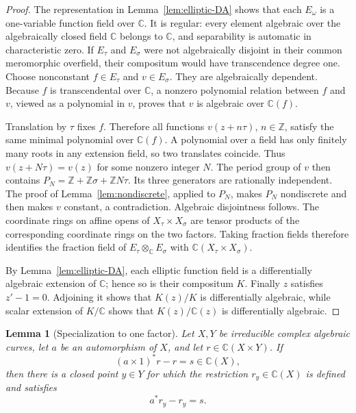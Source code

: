 \documentclass[11pt]{article}
\numberwithin{equation}{section}
\newtheorem{lemma}[theorem]{Lemma}
\theoremstyle{definition}
\theoremstyle{remark}
\newcommand{\C}{\mathbb C}
\newcommand{\Z}{\mathbb Z}
\begin{document}
\begin{proof}
The representation in Lemma~\ref{lem:elliptic-DA} shows that each
$E_\omega$ is a one-variable function field over $\C$.  It is regular:
every element algebraic over the algebraically closed field $\C$ belongs to
$\C$, and separability is automatic in characteristic zero.  If
$E_\tau$ and $E_\sigma$ were not
algebraically disjoint in their common meromorphic overfield, their
compositum would have transcendence degree one.  Choose nonconstant
$f\in E_\tau$ and $v\in E_\sigma$.  They are algebraically dependent.
Because $f$ is transcendental over $\C$, a nonzero polynomial relation
between $f$ and $v$, viewed as a polynomial in $v$, proves that $v$ is
algebraic over $\C(f)$.

Translation by $\tau$ fixes $f$.  Therefore all functions
$v(z+n\tau)$, $n\in\Z$, satisfy the same minimal polynomial over
$\C(f)$.  A polynomial over a field has only finitely many roots in any
extension field, so two translates coincide.  Thus
$v(z+N\tau)=v(z)$ for some nonzero integer $N$.  The period group of $v$
then contains $P_N=\Z+\Z\sigma+\Z N\tau$.  Its three generators are
rationally independent.  The proof of Lemma~\ref{lem:nondiscrete}, applied
to $P_N$, makes $P_N$ nondiscrete and then makes $v$ constant, a
contradiction.  Algebraic disjointness follows.  The coordinate rings on
affine opens of $X_\tau\times X_\sigma$ are tensor products of the
corresponding coordinate rings on the two factors.  Taking fraction fields
therefore identifies the fraction field of
$E_\tau\otimes_\C E_\sigma$ with $\C(X_\tau\times X_\sigma)$.

By Lemma~\ref{lem:elliptic-DA}, each elliptic function field is a
differentially algebraic extension of $\C$; hence so is their compositum
$K$.  Finally $z$ satisfies $z'-1=0$.  Adjoining it shows that $K(z)/K$ is
differentially algebraic, while scalar extension of $K/\C$ shows that
$K(z)/\C(z)$ is differentially algebraic.
\end{proof}

\begin{lemma}[Specialization to one factor]
\label{lem:specialization}
Let $X,Y$ be irreducible complex algebraic curves, let $a$ be an automorphism
of $X$, and let $r\in\C(X\times Y)$.  If
\[
 (a\times1)^*r-r=s\in\C(X),
\]
then there is a closed point $y\in Y$ for which the restriction
$r_y\in\C(X)$ is defined and satisfies
\[
 a^*r_y-r_y=s.
\]
\end{lemma}
\end{document}
